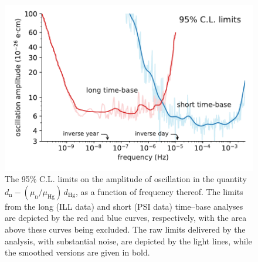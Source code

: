 \begin{figure}
  \centering
  \includegraphics[width=\columnwidth]{gfx/axions/psi_ill_1e-26ecm.pdf}
  \caption{The 95\% C.L. limits on the amplitude of oscillation in the quantity $d_\mathrm{n} - \left( \mu_\mathrm{n} / \mu_\textrm{Hg} \right) \, d_\textrm{Hg}$, as a function of frequency thereof. The limits from the long (ILL data) and short (PSI data) time--base analyses are depicted by the red and blue curves, respectively, with the area above these curves being excluded.
  The raw limits delivered by the analysis, with substantial noise, are depicted by the light lines, while the smoothed versions are given in bold.
  }

  \label{fig:ecm_limits}
\end{figure}

